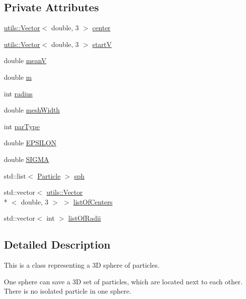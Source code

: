 \subsection*{Private Attributes}
\begin{DoxyCompactItemize}
\item 
\hyperlink{classutils_1_1Vector}{utils\-::\-Vector}$<$ double, 3 $>$ \hyperlink{classSphere_a23d3e7709e2cabae2608d470a1edcece}{center}
\item 
\hyperlink{classutils_1_1Vector}{utils\-::\-Vector}$<$ double, 3 $>$ \hyperlink{classSphere_a93f232ff2747403c36fbe0513155da89}{start\-V}
\item 
double \hyperlink{classSphere_a2cd2b54a44a8c48132a37bc99e9540a3}{mean\-V}
\item 
double \hyperlink{classSphere_aa98b073187155748b82f6675aa65a2d3}{m}
\item 
int \hyperlink{classSphere_ab4adc2969e56bb99f4a88fac7a390313}{radius}
\item 
double \hyperlink{classSphere_a0e2523061bbf7ebef88534efeefe91f9}{mesh\-Width}
\item 
int \hyperlink{classSphere_ae52652f5262aa5268f2442a0c598917e}{par\-Type}
\item 
double \hyperlink{classSphere_ada633ebd567ecc2c88b9e31d7de8fc31}{E\-P\-S\-I\-L\-O\-N}
\item 
double \hyperlink{classSphere_a1515a874e99244d9c4bc2bd782a4eb7f}{S\-I\-G\-M\-A}
\item 
std\-::list$<$ \hyperlink{classParticle}{Particle} $>$ \hyperlink{classSphere_a0f3aa4c3e86814bb8f7061dc83fc992c}{sph}
\item 
std\-::vector$<$ \hyperlink{classutils_1_1Vector}{utils\-::\-Vector}\\*
$<$ double, 3 $>$ $>$ \hyperlink{classSphere_a9c74234600792e31954bcbf58e692b95}{list\-Of\-Centers}
\item 
std\-::vector$<$ int $>$ \hyperlink{classSphere_a97986825b799049cdc4ffbe535e23200}{list\-Of\-Radii}
\end{DoxyCompactItemize}


\subsection{Detailed Description}
This is a class representing a 3\-D sphere of particles. 

One sphere can save a 3\-D set of particles, which are located next to each other. There is no isolated particle in one sphere. 

